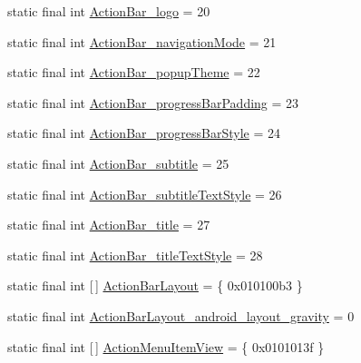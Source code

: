\begin{DoxyCompactItemize}
\item 
static final int \mbox{\hyperlink{classandroid_1_1support_1_1design_1_1R_1_1styleable_a86ca0f740a6f7fe3e7d8f0e3e2efc2fb}{Action\+Bar\+\_\+logo}} = 20
\item 
static final int \mbox{\hyperlink{classandroid_1_1support_1_1design_1_1R_1_1styleable_ad8fc95cefb1d2c2d0815786770b65a1c}{Action\+Bar\+\_\+navigation\+Mode}} = 21
\item 
static final int \mbox{\hyperlink{classandroid_1_1support_1_1design_1_1R_1_1styleable_a22c29ca0b2146dd2c86f2d13c59de6f2}{Action\+Bar\+\_\+popup\+Theme}} = 22
\item 
static final int \mbox{\hyperlink{classandroid_1_1support_1_1design_1_1R_1_1styleable_aae1eb490ac32d9e0bbc4326a4e374325}{Action\+Bar\+\_\+progress\+Bar\+Padding}} = 23
\item 
static final int \mbox{\hyperlink{classandroid_1_1support_1_1design_1_1R_1_1styleable_a823543c4fcadad685e4c3557843553a1}{Action\+Bar\+\_\+progress\+Bar\+Style}} = 24
\item 
static final int \mbox{\hyperlink{classandroid_1_1support_1_1design_1_1R_1_1styleable_af38d3d211d001a3de3f41047872d1d03}{Action\+Bar\+\_\+subtitle}} = 25
\item 
static final int \mbox{\hyperlink{classandroid_1_1support_1_1design_1_1R_1_1styleable_a61ba4d4c7ed4f102d875585fa663c19c}{Action\+Bar\+\_\+subtitle\+Text\+Style}} = 26
\item 
static final int \mbox{\hyperlink{classandroid_1_1support_1_1design_1_1R_1_1styleable_a974d8b355e87b19ea9acfc917454fd6c}{Action\+Bar\+\_\+title}} = 27
\item 
static final int \mbox{\hyperlink{classandroid_1_1support_1_1design_1_1R_1_1styleable_a0a7ad4430a13ba3151323314a540d21f}{Action\+Bar\+\_\+title\+Text\+Style}} = 28
\item 
static final int \mbox{[}$\,$\mbox{]} \mbox{\hyperlink{classandroid_1_1support_1_1design_1_1R_1_1styleable_a0836ebb5f737b4f92fdf54e3c8fee963}{Action\+Bar\+Layout}} = \{ 0x010100b3 \}
\item 
static final int \mbox{\hyperlink{classandroid_1_1support_1_1design_1_1R_1_1styleable_ab454e80c9d4eb411b2c24185392fdf3a}{Action\+Bar\+Layout\+\_\+android\+\_\+layout\+\_\+gravity}} = 0
\item 
static final int \mbox{[}$\,$\mbox{]} \mbox{\hyperlink{classandroid_1_1support_1_1design_1_1R_1_1styleable_a8012131c7219387ea0073f47dbd32125}{Action\+Menu\+Item\+View}} = \{ 0x0101013f \}
\item 

\end{DoxyCompactItemize}
